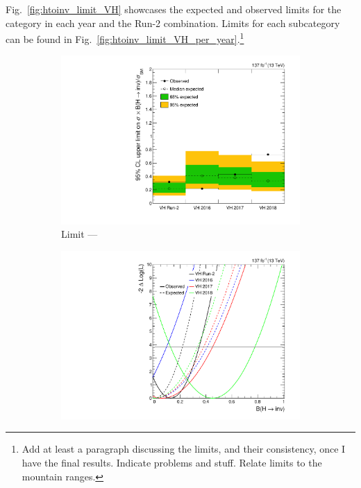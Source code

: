 Fig.~\ref{fig:htoinv_limit_VH} showcases the expected and observed limits for the \VH category in each year and the Run-2 combination. Limits for each subcategory can be found in Fig.~\ref{fig:htoinv_limit_VH_per_year}.\footnote{Add at least a paragraph discussing the limits, and their consistency, once I have the final results. Indicate problems and stuff. Relate limits to the mountain ranges.}

\begin{figure}[htbp]
    \centering
    \begin{subfigure}[t]{0.45\textwidth}
        \includegraphics[width=\textwidth]{figures/limits/VH/limit_Run2_VH.pdf}
        \caption{Limit --- \VH}
    \end{subfigure}
    \hspace{0.05\textwidth}
    \begin{subfigure}[t]{0.45\textwidth}
        \includegraphics[width=\textwidth]{figures/likelihood_scan/profile_likelihood_scan_Run2_VH.pdf}

\end{subfigure}
\end{figure}
